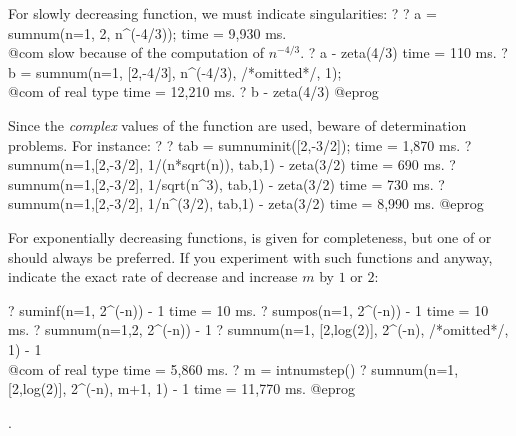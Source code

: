For slowly decreasing function, we must indicate singularities:
\bprog
? 
? a = sumnum(n=1, 2, n^(-4/3));
time = 9,930 ms. \\@com slow because of the computation of $n^{-4/3}$.
? a - zeta(4/3)
time = 110 ms.
? b = sumnum(n=1, [2,-4/3], n^(-4/3), /*omitted*/, 1); \\@com of real type
time = 12,210 ms.
? b - zeta(4/3)
@eprog

Since the \emph{complex} values of the function are used, beware of
determination problems. For instance:
\bprog
? 
? tab = sumnuminit([2,-3/2]);
time = 1,870 ms.
? sumnum(n=1,[2,-3/2], 1/(n*sqrt(n)), tab,1) - zeta(3/2)
time = 690 ms.
? sumnum(n=1,[2,-3/2], 1/sqrt(n^3), tab,1) - zeta(3/2)
time = 730 ms.
? sumnum(n=1,[2,-3/2], 1/n^(3/2), tab,1) - zeta(3/2)
time = 8,990 ms.
@eprog

For exponentially decreasing functions,  is given for
completeness, but one of  or  should always be
preferred. If you experiment with such functions and  anyway,
indicate the exact rate of decrease and increase $m$ by $1$ or $2$:

\bprog
? suminf(n=1, 2^(-n)) - 1
time = 10 ms.
? sumpos(n=1, 2^(-n)) - 1
time = 10 ms.
? sumnum(n=1,2, 2^(-n)) - 1
? sumnum(n=1, [2,log(2)], 2^(-n), /*omitted*/, 1) - 1 \\@com of real type
time = 5,860 ms.
? m = intnumstep()
? sumnum(n=1,[2,log(2)], 2^(-n), m+1, 1) - 1
time = 11,770 ms.
@eprog

.

